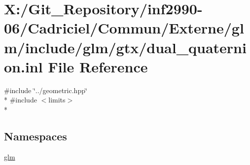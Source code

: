 \hypertarget{dual__quaternion_8inl}{\section{X\-:/\-Git\-\_\-\-Repository/inf2990-\/06/\-Cadriciel/\-Commun/\-Externe/glm/include/glm/gtx/dual\-\_\-quaternion.inl File Reference}
\label{dual__quaternion_8inl}
}
{\ttfamily \#include \char`\"{}../geometric.\-hpp\char`\"{}}\\*
{\ttfamily \#include $<$limits$>$}\\*
\subsection*{Namespaces}
\begin{DoxyCompactItemize}
\item 
\hyperlink{namespaceglm}{glm}
\end{DoxyCompactItemize}
